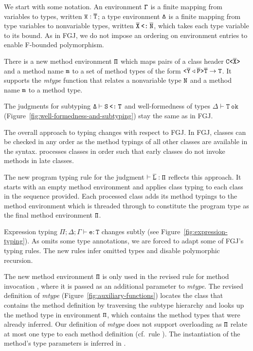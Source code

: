 We start with some notation.
An environment ${\tt \Gamma}$ is a finite mapping from variables to types,
written $\overline{\tt x}:\overline{\tt T}$; a type environment ${\tt \Delta}$ is a finite mapping
from type variables to nonvariable types, written $\overline{\tt X}\mathbin{\texttt{<:}}\overline{\tt N}$, which takes each type variable to its bound. As in FGJ, we do not
impose an ordering on environment entries to enable F-bounded
polymorphism.

There is a new method environment ${\tt \Pi}$ which maps pairs of a class header
$\mathtt{C \texttt{<} \overline{\tt X} \texttt{>} }$ and a method name ${\tt m}$ to a set of method
types of the form $\mathtt{ \texttt{<} \overline{\tt Y} \triangleleft  \overline{\tt P} \texttt{>} } \overline{\tt T} \to {\tt T}$. 
It supports the \textit{mtype} function that relates a nonvariable type
${\tt N}$ and a method name ${\tt m}$ to a method type.

The judgments for subtyping $\mathtt{\Delta \vdash S \mathbin{\texttt{<:}} T}$ and
well-formedness of types $\mathtt{\Delta \vdash T\ \mathtt{ok}}$
(Figure~\ref{fig:well-formedness-and-subtyping}) stay the same as in
FGJ.

The overall approach to typing changes with respect to FGJ. In FGJ,
classes can be checked in any order as the method typings of all other
classes are available in the syntax. \TFGJ processes classes in
order such that early classes do not invoke methods in late classes. 


The new program typing rule  for the judgment
$\vdash \overline{\tt L} : {\tt \Pi}$ reflects this
approach. It starts with an empty
method environment and applies class typing to each class in the
sequence provided. Each processed class adds its method typings to the method
environment which is threaded through to constitute the program type
as the final method environment ${\tt \Pi}$. 


Expression typing $\mathtt{\Pi; \Delta; \Gamma \vdash e
  : T}$ changes subtly (see Figure~\ref{fig:expression-typing}). As
\TFGJ omits some type annotations, we are forced to adapt some of  
FGJ's typing rules. The new rules infer omitted types and disable
polymorphic recursion. 

The new method 
environment ${\tt \Pi}$ is only used in the revised
rule for method invocation 
, where it is passed as an additional parameter to
\textit{mtype}. The revised definition of \textit{mtype} (Figure~\ref{fig:auxiliary-functions}) locates the class that contains
the method definition by traversing the subtype hierarchy and looks up the
method type in environment ${\tt \Pi}$, which contains the method types
that were already inferred. Our definition of \textit{mtype} does not support
overloading as ${\tt \Pi}$ relate at most one type to each method
definition (cf.\ rule ). The instantiation of the
method's type parameters is inferred in \TFGJ.

